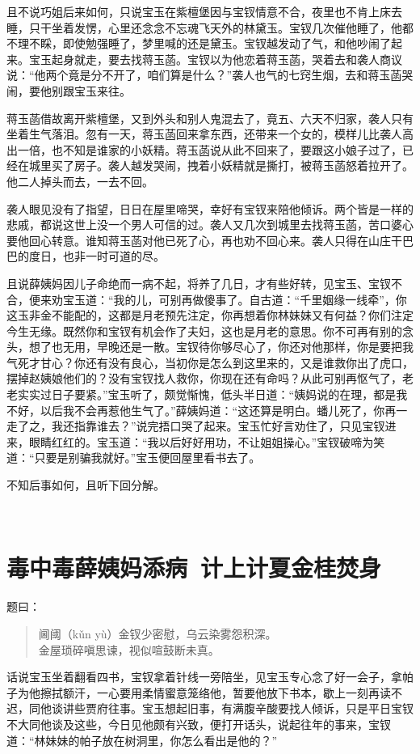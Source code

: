 \documentclass[12pt,oneside]{book}
\newenvironment{shici}{%
\begin{verse}%
\centering\large\hspace{12pt}}%
{\end{verse}}
\begin{document}
且不说巧姐后来如何，只说宝玉在紫檀堡因与宝钗情意不合，夜里也不肯上床去睡，只干坐着发愣，心里还念念不忘魂飞天外的林黛玉。宝钗几次催他睡了，他都不理不睬，即使勉强睡了，梦里喊的还是黛玉。宝钗越发动了气，和他吵闹了起来。宝玉起身就走，要去找蒋玉菡。宝钗以为他恋着蒋玉菡，哭着去和袭人商议说：“他两个竟是分不开了，咱们算是什么？”袭人也气的七窍生烟，去和蒋玉菡哭闹，要他别跟宝玉来往。

蒋玉菡借故离开紫檀堡，又到外头和别人鬼混去了，竟五、六天不归家，袭人只有坐着生气落泪。忽有一天，蒋玉菡回来拿东西，还带来一个女的，模样儿比袭人高出一倍，也不知是谁家的小妖精。蒋玉菡说从此不回来了，要跟这小娘子过了，已经在城里买了房子。袭人越发哭闹，拽着小妖精就是撕打，被蒋玉菡怒着拉开了。他二人掉头而去，一去不回。

袭人眼见没有了指望，日日在屋里啼哭，幸好有宝钗来陪他倾诉。两个皆是一样的悲戚，都说这世上没一个男人可信的过。袭人又几次到城里去找蒋玉菡，苦口婆心要他回心转意。谁知蒋玉菡对他已死了心，再也劝不回心来。袭人只得在山庄干巴巴的度日，也非一时可道的尽。

且说薛姨妈因儿子命绝而一病不起，将养了几日，才有些好转，见宝玉、宝钗不合，便来劝宝玉道：“我的儿，可别再做傻事了。自古道：“千里姻缘一线牵”，你这玉非金不能配的，这都是月老预先注定，你再想着你林妹妹又有何益？你们注定今生无缘。既然你和宝钗有机会作了夫妇，这也是月老的意思。你不可再有别的念头，想了也无用，早晚还是一散。宝钗待你够尽心了，你还对他那样，你是要把我气死才甘心？你还有没有良心，当初你是怎么到这里来的，又是谁救你出了虎口，摆掉赵姨娘他们的？没有宝钗找人救你，你现在还有命吗？从此可别再怄气了，老老实实过日子要紧。”宝玉听了，颇觉惭愧，低头半日道：“姨妈说的在理，都是我不好，以后我不会再惹他生气了。”薛姨妈道：“这还算是明白。蟠儿死了，你再一走了之，我还指靠谁去？”说完捂口哭了起来。宝玉忙好言劝住了，只见宝钗进来，眼睛红红的。宝玉道：“我以后好好用功，不让姐姐操心。”宝钗破啼为笑道：“只要是别骗我就好。”宝玉便回屋里看书去了。

不知后事如何，且听下回分解。

 
 
\chapter{毒中毒薛姨妈添病~计上计夏金桂焚身}
题曰：

\begin{shici}
阃阈（kǔn yù）金钗少密慰，乌云染雾怨积深。\\
金屋琐碎嗔思谏，视似喧鼓断未真。
\end{shici}

话说宝玉坐着翻看四书，宝钗拿着针线一旁陪坐，见宝玉专心念了好一会子，拿帕子为他擦拭额汗，一心要用柔情蜜意笼络他，暂要他放下书本，歇上一刻再读不迟，同他谈讲些贾府往事。宝玉想起旧事，有满腹辛酸要找人倾诉，只是平日宝钗不大同他谈及这些，今日见他颇有兴致，便打开话头，说起往年的事来，宝钗道：“林妹妹的帕子放在树洞里，你怎么看出是他的？”
\end{document}
